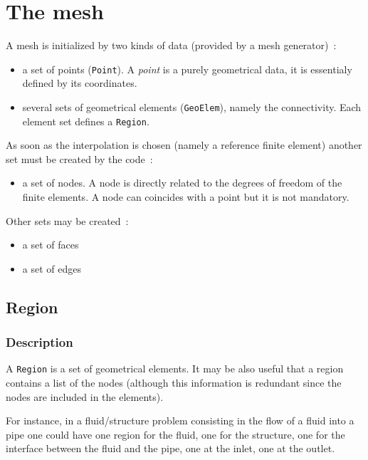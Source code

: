 \documentclass{article}
\begin{document}
\section{The mesh}
A mesh is initialized by two kinds of data (provided by a mesh generator)~: 

\begin{itemize}
\item a set of points (\texttt{Point}). A \textit{point} is a purely
  geometrical data, it is essentialy defined by its coordinates.
\item several sets of geometrical elements (\texttt{GeoElem}), 
namely the connectivity. Each element set defines a \texttt{Region}. 
\end{itemize}

As soon as the interpolation is chosen (namely a reference finite
element) another set must be created by the code~:

\begin{itemize}
\item a set of nodes. A node is directly related to the degrees of
  freedom of the finite elements. A node can coincides with a point but
  it is not mandatory.
\end{itemize}

Other sets may be created~:
\begin{itemize}
\item a set of faces
\item a set of edges
\end{itemize}

\subsection{Region}

\subsubsection{Description}

A \texttt{Region} is a set of geometrical elements.  It may be also
useful that a region contains a list of the nodes (although this
information is redundant since the nodes are included in the elements).

For instance, in a fluid/structure problem consisting in the flow of a 
fluid into a pipe one could have one region for the fluid, 
one for the structure, one for the interface between the fluid and the
pipe, one at the inlet, one at the outlet.
\end{document}
